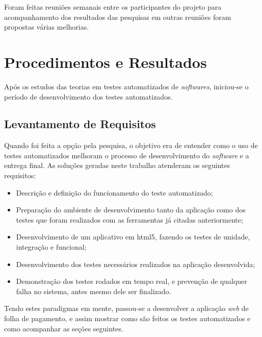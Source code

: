 \par Foram feitas reuniões semanais entre os participantes do projeto para acompanhamento dos resultados das pesquisas em outras reuniões foram propostas várias melhorias.
    
\section{Procedimentos e Resultados}

\par Após os estudos das teorias em testes automatizados de \textit{softwares}, iniciou-se o período de desenvolvimento dos testes automatizados.

\subsection{Levantamento de Requisitos}

\par Quando foi feita a opção pela pesquisa, o objetivo era de entender como o uso de testes automatizados melhoram o processo de desenvolvimento do \textit{software} e a entrega final. As soluções geradas neste trabalho  atenderam os seguintes requisitos:

\begin{itemize}
\item Descrição e definição do funcionamento do teste automatizado;

\item Preparação do ambiente de desenvolvimento tanto da aplicação como dos testes que foram realizados com as ferramentas já citadas anteriormente;

\item Desenvolvimento de um aplicativo em html5, fazendo os testes de unidade, integração e funcional;

\item Desenvolvimento dos testes necessários realizados na aplicação desenvolvida;

\item Demonstração dos testes rodados em tempo real, e prevenção de qualquer falha no sistema, antes mesmo dele ser finalizado. 

\end{itemize}

\par Tendo estes paradigmas em mente, passou-se a desenvolver a aplicação \textit{web} de folha de pagamento, e assim mostrar como são feitos os testes automatizados e como acompanhar as seções seguintes.


